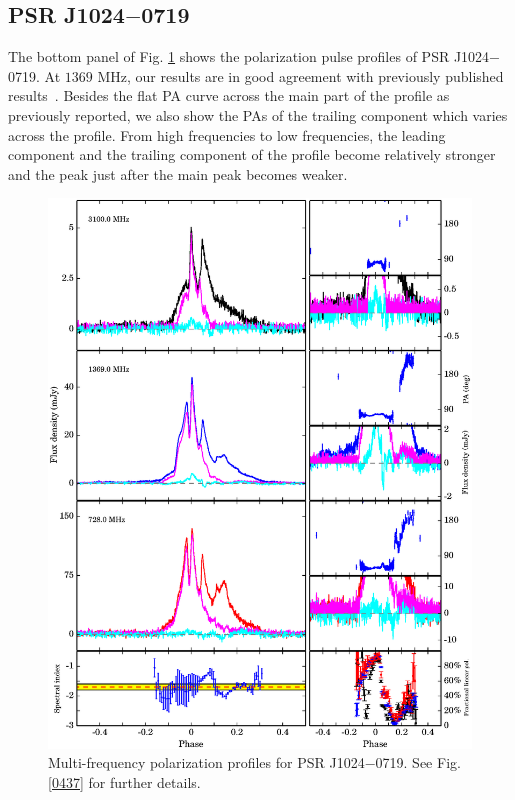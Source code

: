 \documentclass[useAMS,usenatbib]{mn2e}
\begin{document}
%


%
\subsection{PSR J1024$-$0719}

The bottom panel of Fig. \ref{1024} shows the polarization pulse profiles of 
PSR J1024$-$0719.
%
At $1369$ MHz, our results are in good agreement with previously published
results~\citep{Ord04,Yan11}. 
%
Besides the flat PA curve across the main part of the profile as 
previously reported, we also show the PAs of the trailing component which 
varies across the profile.
%
From high frequencies to low frequencies, the leading component and the 
trailing component of the profile become relatively stronger and the peak 
just after the main peak becomes weaker.

\begin{figure}
\begin{center}
\includegraphics[width=6 in]{1024.ps}
\caption{Multi-frequency polarization profiles for PSR J1024$-$0719. 
See Fig. \ref{0437} for further details.}
\label{1024}
\end{center}
\end{figure}
\end{document}
